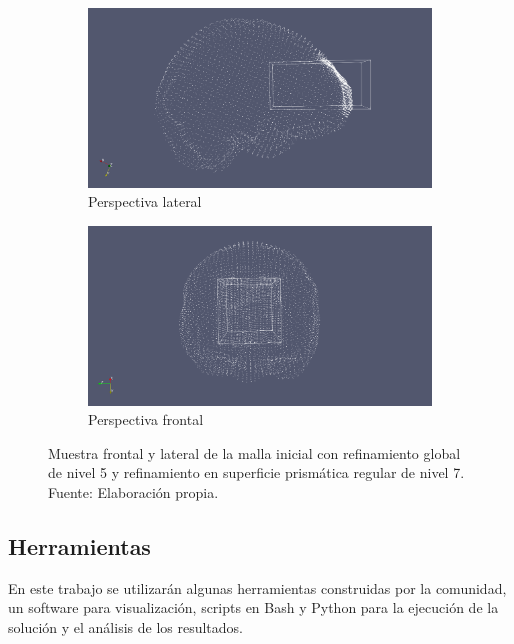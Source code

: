 \begin{figure}[!ht]
    \centering
    \begin{subfigure}[t]{0.45\textwidth}
        \includegraphics[width=1.0\textwidth]{figures/bad_quality_zone/cortex_surf.png}
        \caption{Perspectiva lateral}
    \end{subfigure}
    \begin{subfigure}[t]{0.45\textwidth}
        \includegraphics[width=1.0\textwidth]{figures/bad_quality_zone/cortex_surf_points.png}
        \caption{Perspectiva frontal}
    \end{subfigure}
    \caption{  Muestra frontal y lateral de la malla inicial con refinamiento global de nivel 5 y refinamiento en superficie prismática regular de nivel 7.\\ Fuente: Elaboración propia.}
    \label{fig:cortex_surf}
\end{figure}

\subsection{Herramientas}

En este trabajo se utilizarán algunas herramientas construidas por la comunidad, un software para visualización, scripts en Bash y Python para la ejecución de la solución y el análisis de los resultados.

